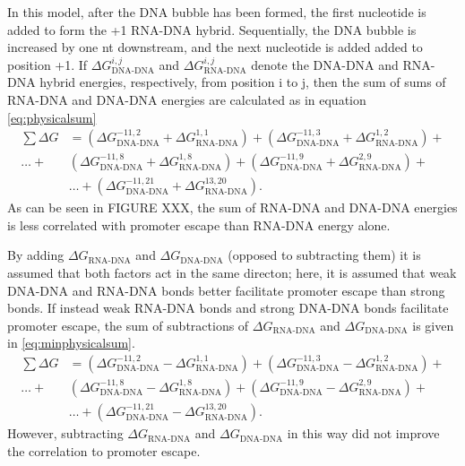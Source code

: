 \documentclass[a4paper]{article}
\begin{document}
In this model, after the DNA bubble has been formed, the first nucleotide is added to form the
+1 RNA-DNA hybrid. Sequentially, the DNA bubble is increased by one nt
downstream, and the next nucleotide is added added to position +1. If $\Delta
G_{\text{DNA-DNA}}^{i,j}$ and $\Delta G_{\text{RNA-DNA}}^{i,j}$ denote the
DNA-DNA and RNA-DNA hybrid energies, respectively, from position i to j, then
the sum of sums of RNA-DNA and DNA-DNA energies are calculated as in equation
\eqref{eq:physicalsum} 
\begin{align}
	\label{eq:physicalsum}
	\sum \Delta G &=
	\left(\Delta G_{\text{DNA-DNA}}^{-11,2} + \Delta
	G_{\text{RNA-DNA}}^{1,1}\right) + \left(\Delta G_{\text{DNA-DNA}}^{-11,3} + \Delta
	G_{\text{RNA-DNA}}^{1,2}\right) + \nonumber \\
	 \dots + & \left(\Delta G_{\text{DNA-DNA}}^{-11,8} + \Delta G_{\text{RNA-DNA}}^{1,8}\right)
	+ \left(\Delta G_{\text{DNA-DNA}}^{-11,9} + \Delta
	G_{\text{RNA-DNA}}^{2,9}\right) +\nonumber \\
	 & \dots
	+ \left(\Delta G_{\text{DNA-DNA}}^{-11,21} + \Delta G_{\text{RNA-DNA}}^{13,20}\right).
\end{align}
As can be seen in FIGURE XXX, the sum of RNA-DNA and DNA-DNA energies is less
correlated with promoter escape than RNA-DNA energy alone.

By adding $\Delta G_{\text{RNA-DNA}}$ and $\Delta G_{\text{DNA-DNA}}$ (opposed
to subtracting them) it is assumed that both factors
act in the same directon; here, it is assumed that weak DNA-DNA and
RNA-DNA bonds better facilitate promoter escape than strong bonds. If instead
weak RNA-DNA bonds and strong DNA-DNA bonds facilitate promoter escape, the sum
of subtractions of $\Delta G_{\text{RNA-DNA}}$ and $\Delta G_{\text{DNA-DNA}}$
is given in \eqref{eq:minphysicalsum}.
\begin{align}
	\label{eq:minphysicalsum}
	\sum \Delta G &=
	\left(\Delta G_{\text{DNA-DNA}}^{-11,2} - \Delta
	G_{\text{RNA-DNA}}^{1,1}\right) + \left(\Delta G_{\text{DNA-DNA}}^{-11,3} - \Delta
	G_{\text{RNA-DNA}}^{1,2}\right) + \nonumber \\
	 \dots + & \left(\Delta G_{\text{DNA-DNA}}^{-11,8} - \Delta G_{\text{RNA-DNA}}^{1,8}\right)
	+ \left(\Delta G_{\text{DNA-DNA}}^{-11,9} - \Delta
	G_{\text{RNA-DNA}}^{2,9}\right) +\nonumber \\
	 & \dots
	+ \left(\Delta G_{\text{DNA-DNA}}^{-11,21} - \Delta G_{\text{RNA-DNA}}^{13,20}\right).
\end{align}
However, subtracting $\Delta G_{\text{RNA-DNA}}$ and $\Delta G_{\text{DNA-DNA}}$
in this way did not improve the correlation to promoter escape. 
\end{document}
